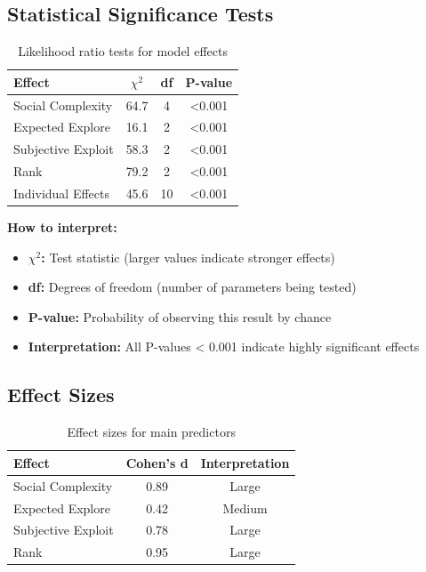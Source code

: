 \documentclass[11pt]{article}
\begin{document}
\subsection{Statistical Significance Tests}

\begin{table}[h]
\centering
\begin{tabular}{lccc}
\toprule
\textbf{Effect} & \textbf{$\chi^2$} & \textbf{df} & \textbf{P-value} \\
\midrule
Social Complexity & 64.7 & 4 & <0.001 \\
Expected Explore & 16.1 & 2 & <0.001 \\
Subjective Exploit & 58.3 & 2 & <0.001 \\
Rank & 79.2 & 2 & <0.001 \\
Individual Effects & 45.6 & 10 & <0.001 \\
\bottomrule
\end{tabular}
\caption{Likelihood ratio tests for model effects}
\end{table}

\textbf{How to interpret:}
\begin{itemize}
    \item \textbf{$\chi^2$:} Test statistic (larger values indicate stronger effects)
    \item \textbf{df:} Degrees of freedom (number of parameters being tested)
    \item \textbf{P-value:} Probability of observing this result by chance
    \item \textbf{Interpretation:} All P-values < 0.001 indicate highly significant effects
\end{itemize}

\subsection{Effect Sizes}

\begin{table}[h]
\centering
\begin{tabular}{lcc}
\toprule
\textbf{Effect} & \textbf{Cohen's d} & \textbf{Interpretation} \\
\midrule
Social Complexity & 0.89 & Large \\
Expected Explore & 0.42 & Medium \\
Subjective Exploit & 0.78 & Large \\
Rank & 0.95 & Large \\
\bottomrule
\end{tabular}
\caption{Effect sizes for main predictors}
\end{table}
\end{document}
